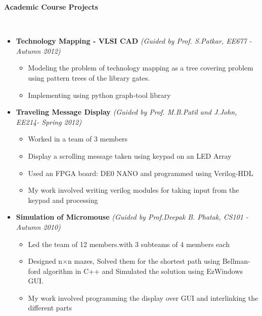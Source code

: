 \documentclass[a4paper,11pt]{article}
\newcommand{\isep}{-2 pt}
\newcommand{\lsep}{-0.5cm}
\newcommand{\resheading}[1]{{\small \colorbox{mygrey}{\begin{minipage}{0.975\textwidth}{\textbf{#1 \vphantom{p\^{E}}}}\end{minipage}}}}
\begin{document}
\resheading{\textbf{\large Academic Course Projects}}\\[\lsep]
\begin{itemize}
    \item \textbf{Technology Mapping - VLSI CAD} \hfill \emph{(Guided by Prof. S.Patkar, EE677 - Autumn 2012)} \\[-0.6cm]
    \begin{itemize} \itemsep \isep
        \item Modeling the problem of technology mapping as a tree covering problem using pattern trees of the library gates.
        \item Implementing using python graph-tool library
    \end{itemize}
\pagebreak

    \item \textbf{Traveling Message Display} \hfill \emph{(Guided by Prof. M.B.Patil and J.John, EE214- Spring 2012)}\\[-0.6cm]
    \begin{itemize}\itemsep \isep
        \item Worked in a team of 3 members
        \item Display a scrolling message taken using keypad on an LED Array
        \item Used an FPGA board: DE0 NANO and programmed using Verilog-HDL
        \item My work involved writing verilog modules for taking input from the keypad and processing
    \end{itemize}
    	\item \textbf{Simulation of Micromouse} \hfill \emph{(Guided by Prof.Deepak B. Phatak, CS101 - Autumn 2010)}\\[-0.6cm]
	\begin{itemize}\itemsep \isep 
	    \item Led the team of 12 members.with 3 subteams of 4 members each
	    \item Designed n$\times$n mazes, Solved them for the shortest path using Bellman-ford algorithm in C++ and Simulated the solution using EzWindows GUI.
	    \item My work involved programming the display over GUI and interlinking the different parts
	\end{itemize} 
\begin{comment}
\item \textbf{Term paper on Working of a Cordless Telephone} \emph{(Guided by Prof. Vasi J. , EE112 - Spring 2011)\\[-0.6cm]}
	\begin{itemize} \itemsep \isep
	  \item Opened and Analyzed a Cordless phone.
	  \item Worked in a team of 3 members.
	  \item Written a 12-page Term paper with details of working of the phone.
	\end{itemize}
\end{comment}
\end{itemize}
\end{document}
